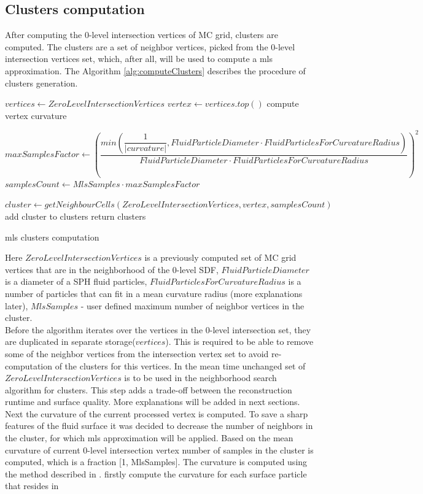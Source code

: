 \subsection{Clusters computation}
After computing the 0-level intersection vertices of MC grid, clusters are computed. The clusters are a set of neighbor vertices, picked from the 0-level intersection vertices set, which, after all, will be used to compute a mls approximation. The Algorithm \ref{alg:computeClusters} describes the procedure of clusters generation.
\begin{algorithm}[H]
	\scriptsize
	\begin{algorithmic}
			\State $vertices \gets ZeroLevelIntersectionVertices$
				\State $vertex \gets vertices.top()$
				\State compute vertex curvature

				\State $maxSamplesFactor \gets \left(\dfrac{min(\dfrac{1}{|curvature|}, FluidParticleDiameter \cdot FluidParticlesForCurvatureRadius)}{FluidParticleDiameter \cdot FluidParticlesForCurvatureRadius}\right)^2$
				\State $samplesCount \gets MlsSamples \cdot maxSamplesFactor$

				\State $cluster \gets getNeighbourCells(ZeroLevelIntersectionVertices, vertex, samplesCount)$
				\State add cluster to clusters
			\EndWhile
			\State return clusters
	\end{algorithmic}
	\caption{mls clusters computation}
	\label{alg:computeClusters}
\end{algorithm}
Here $ZeroLevelIntersectionVertices$ is a previously computed set of MC grid vertices  that are in the neighborhood of the 0-level SDF,  
$FluidParticleDiameter$ is a diameter of a SPH fluid particles, $FluidParticlesForCurvatureRadius$ is a number of particles that can fit in a mean curvature radius (more explanations later), $MlsSamples$ - user defined maximum number of neighbor vertices in the cluster.\\
Before the algorithm iterates over the vertices in the 0-level intersection set, they are duplicated in separate storage($vertices$). This is required to be able to remove some of the neighbor vertices from the intersection vertex set to avoid re-computation of the clusters for this vertices. In the mean time unchanged set of $ZeroLevelIntersectionVertices$ is to be used in the neighborhood search algorithm for clusters. This step adds a trade-off between the reconstruction runtime and surface quality. More explanations will be added in next sections.\\
Next the curvature of the current processed vertex is computed. To save a sharp features of the fluid surface it was decided to decrease the number of neighbors in the cluster, for which mls approximation will be applied. Based on the mean curvature of current 0-level intersection vertex number of samples in the cluster is computed, which is a fraction [1, MlsSamples]. The curvature is computed using the method described in \cite{CurvatureComputation}. firstly compute the curvature for each surface particle that resides in
